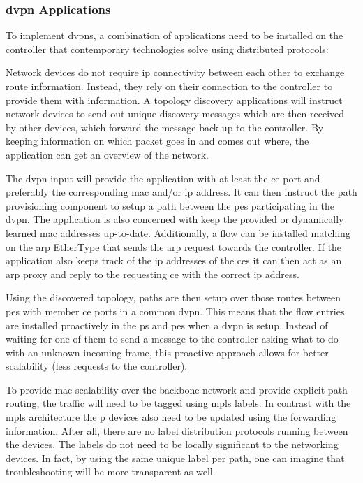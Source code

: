\subsubsection{\acs{dvpn} Applications} %
\label{ssub:dvpn_application}


To implement \acp{dvpn}, a combination of applications need to be installed on the controller that contemporary technologies solve using distributed protocols:

\begin{description}[leftmargin=!,labelwidth=\widthof{\bfseries Topology Discovery}]
	\item[Topology Discovery] Network devices do not require \ac{ip} connectivity between each other to exchange route information. Instead, they rely on their connection to the controller to provide them with information. A topology discovery applications will instruct network devices to send out unique discovery messages which are then received by other devices, which forward the message back up to the controller. By keeping information on which packet goes in and comes out where, the application can get an overview of the network.
	
	\item[\ac{dvpn} Provisioning] The \ac{dvpn} input will provide the application with at least the \ac{ce} port and preferably the corresponding \ac{mac} and/or \ac{ip} address. It can then instruct the path provisioning component to setup a path between the \acp{pe} participating in the \ac{dvpn}. The application is also concerned with keep the provided or dynamically learned \ac{mac} addresses up-to-date. Additionally, a flow can be installed matching on the \ac{arp} EtherType that sends the \ac{arp} request towards the controller. If the application also keeps track of the \ac{ip} addresses of the \acp{ce} it can then act as an \ac{arp} proxy and reply to the requesting \ac{ce} with the correct \ac{ip} address.
	
	\item[Path Provisioning] Using the discovered topology, paths are then setup over those routes between \acp{pe} with member \ac{ce} ports in a common \ac{dvpn}. This means that the flow entries are installed proactively in the \acp{p} and \acp{pe} when a \ac{dvpn} is setup. Instead of waiting for one of them to send a message to the controller asking what to do with an unknown incoming frame, this proactive approach allows for better scalability (less requests to the controller).
	
	To provide \ac{mac} scalability over the backbone network and provide explicit path routing, the traffic will need to be tagged using \ac{mpls} labels. In contrast with the \ac{mpls} architecture the \ac{p} devices also need to be updated using the forwarding information. After all, there are no label distribution protocols running between the devices. The labels do not need to be locally significant to the networking devices. In fact, by using the same unique label per path, one can imagine that troubleshooting will be more transparent as well.
	

\end{description}
